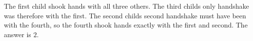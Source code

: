 The first child shook hands with all three others. The third child\textquotesingle s only handshake was therefore with the first. The second child\textquotesingle s second handshake must have been with the fourth, so the fourth shook hands exactly with the first and second. The answer is $\boxed2$.
